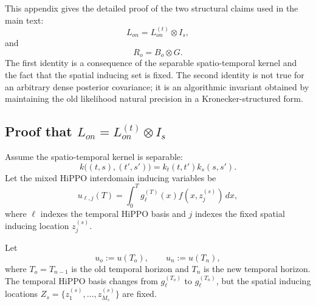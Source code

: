 \documentclass[12pt]{article}
\begin{document}
This appendix gives the detailed proof of the two structural claims used
in the main text:
\begin{equation}
    L_{on}=L_{on}^{(t)}\otimes I_s,
    \label{eq:app_Lon_kron_claim}
\end{equation}
and
\begin{equation}
    R_o=B_o\otimes G.
    \label{eq:app_Ro_kron_claim}
\end{equation}
The first identity is a consequence of the separable spatio-temporal
kernel and the fact that the spatial inducing set is fixed. The second
identity is not true for an arbitrary dense posterior covariance; it is an
algorithmic invariant obtained by maintaining the old likelihood natural
precision in a Kronecker-structured form.

\subsection{\texorpdfstring{Proof that \(L_{on}=L_{on}^{(t)}\otimes I_s\)}{Proof that Lon = Lon(t) tensor Is}}
\label{app:proof_Lon_temporal_only}

Assume the spatio-temporal kernel is separable:
\begin{equation}
    k\big((t,s),(t',s')\big)
    =
    k_t(t,t')k_s(s,s').
    \label{eq:app_sep_kernel}
\end{equation}
Let the mixed HiPPO interdomain inducing variables be
\begin{equation}
    u_{\ell,j}(T)
    =
    \int_0^T
    g_\ell^{(T)}(x)f(x,z_j^{(s)})\,dx,
    \label{eq:app_mixed_inducing}
\end{equation}
where \(\ell\) indexes the temporal HiPPO basis and \(j\) indexes the
fixed spatial inducing location \(z_j^{(s)}\).

Let
\begin{equation}
    u_o := u(T_o),
    \qquad
    u_n := u(T_n),
\end{equation}
where \(T_o=T_{n-1}\) is the old temporal horizon and \(T_n\) is the new
temporal horizon. The temporal HiPPO basis changes from
\(g_\ell^{(T_o)}\) to \(g_\ell^{(T_n)}\), but the spatial inducing
locations \(Z_s=\{z_1^{(s)},\ldots,z_{M_s}^{(s)}\}\) are fixed.
\end{document}
